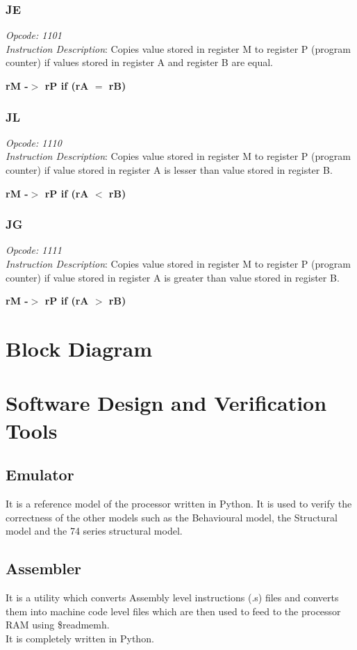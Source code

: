 \documentclass{article}
\begin{document}
\subsubsection{JE}
\textit{Opcode: 1101}  \\
\textit{Instruction Description}:  Copies value stored in register M
to register P (program counter) if values stored in register A and
register B are equal.
\begin{center}\textbf{rM -$>$ rP if (rA $=$ rB)}\end{center}
\subsubsection{JL}
\textit{Opcode: 1110}  \\
\textit{Instruction Description}:  Copies value stored in register M
to register P (program counter) if value stored in register A is
lesser than value stored in register B.
\begin{center}\textbf{rM -$>$ rP if (rA $<$ rB)}\end{center}
\subsubsection{JG}
\textit{Opcode: 1111}  \\
\textit{Instruction Description}:  Copies value stored in register M
to register P (program counter) if value stored in register A is
greater than value stored in register B.
\begin{center}\textbf{rM -$>$ rP if (rA $>$ rB)}\end{center}
\section{\textbf{Block Diagram}}
\section{\textbf{Software Design and Verification Tools}}
\subsection{Emulator}
It is a reference model of the processor written in Python. It is used
to verify the correctness of the other models such as the Behavioural
model, the Structural model and the 74 series structural model.
\subsection{Assembler}
It is a utility which converts Assembly level instructions (.s) files
and converts them into machine code level files which are then used to
feed to the processor RAM using \$readmemh.\\
It is completely written in Python.
\end{document}
